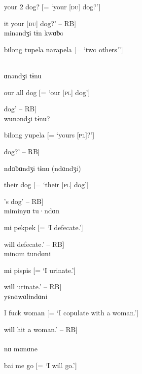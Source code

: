 \noindent your 2 dog? [= ‘your [\textsc{du}] dog?’]

\noindent [‘[Is] it your [\textsc{du}] dog?’ -- RB]\\

\noindent minəndʒi tɨn kwɑƀo

\noindent bilong tupela narapela [= ‘two others’’]

\\

\noindent ɑnəndʒi tɨnu

\noindent our all dog [= ‘our [\textsc{pl}] dog’]

\noindent [‘our [\textsc{pl.excl}] dog’ -- RB]\\

\noindent wunəndʒi tɨnu?

\noindent bilong yupela [= ‘yours [\textsc{pl}]?’]

\noindent [‘your [\textsc{pl}] dog?’ -- RB]\\

\newpage

\noindent ndɑƀɑndʒi tɨnu (ndɑndʒi)

\noindent their dog [= ‘their [\textsc{pl}] dog’]

\noindent [‘those [people]’s dog’ -- RB]\\

\noindent miminyɑ tu·ndɑn

\noindent mi pekpek [= ‘I defecate.’]

\noindent [‘[I] will defecate.’ -- RB]\\

\noindent minɑm tundɑni

\noindent mi pispis [= ‘I urinate.’]

\noindent [‘[I] will urinate.’ -- RB]\\

\noindent yɛnɑwɑlindɑni

\noindent I fuck woman [= ‘I copulate with a woman.’]

\noindent [‘[I] will hit a woman.’ -- RB]\\

\\

\noindent nɑ mɑnɑne


\noindent bai me go [= ‘I will go.’]


